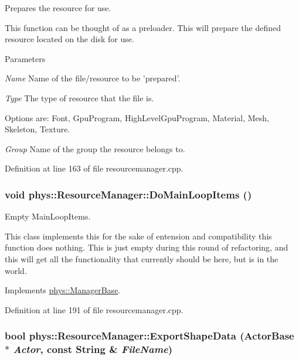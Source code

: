 Prepares the resource for use. 

This function can be thought of as a preloader. This will prepare the defined resource located on the disk for use. 
\begin{DoxyParams}{Parameters}
\item[{\em Name}]Name of the file/resource to be 'prepared'. \item[{\em Type}]The type of resource that the file is. \par
 Options are: Font, GpuProgram, HighLevelGpuProgram, Material, Mesh, Skeleton, Texture. \item[{\em Group}]Name of the group the resource belongs to. \end{DoxyParams}


Definition at line 163 of file resourcemanager.cpp.

\hypertarget{classphys_1_1ResourceManager_a2114714999441c095bc28d3673c2490e}{
\subsubsection[{DoMainLoopItems}]{\setlength{\rightskip}{0pt plus 5cm}void phys::ResourceManager::DoMainLoopItems ()}}
\label{d1/d35/classphys_1_1ResourceManager_a2114714999441c095bc28d3673c2490e}


Empty MainLoopItems. 

This class implements this for the sake of entension and compatibility this function does nothing. This is just empty during this round of refactoring, and this will get all the functionality that currently should be here, but is in the world. 

Implements \hyperlink{classphys_1_1ManagerBase_aa9e13a3f7c398b708f0f242610b5abf7}{phys::ManagerBase}.



Definition at line 191 of file resourcemanager.cpp.

\hypertarget{classphys_1_1ResourceManager_a9511ec29e5c732602b1495173abf56ef}{
\subsubsection[{ExportShapeData}]{\setlength{\rightskip}{0pt plus 5cm}bool phys::ResourceManager::ExportShapeData ({\bf ActorBase} $\ast$ {\em Actor}, \/  const {\bf String} \& {\em FileName})}}
\label{d1/d35/classphys_1_1ResourceManager_a9511ec29e5c732602b1495173abf56ef}


